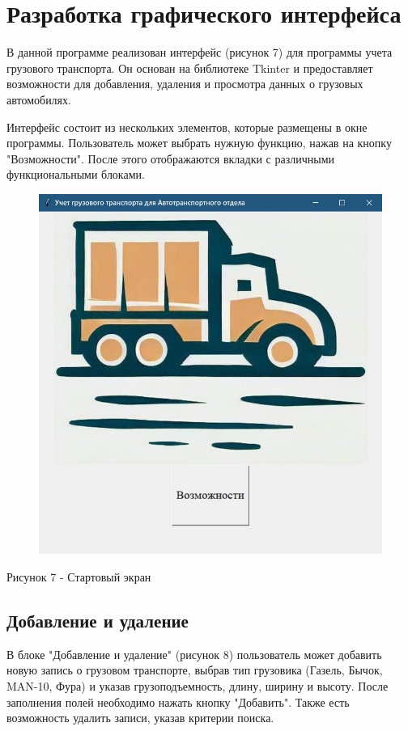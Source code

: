\documentclass[14pt]{extreport}
\begin{document}
    \section{Разработка графического интерфейса}

    В данной программе реализован интерфейс (рисунок 7) для программы учета грузового транспорта. Он основан на библиотеке Tkinter и предоставляет возможности для добавления, удаления и просмотра данных о грузовых автомобилях.

Интерфейс состоит из нескольких элементов, которые размещены в окне программы. Пользователь может выбрать нужную функцию, нажав на кнопку "Возможности". После этого отображаются вкладки с различными функциональными блоками.
\begin{figure}[H]
    \centering
    \includegraphics[scale=0.7]{1.jpg}
\end{figure}
\begin{center}
    Рисунок 7 - Стартовый экран
\end{center}

\subsection{Добавление и удаление}

В блоке "Добавление и удаление" (рисунок 8) пользователь может добавить новую запись о грузовом транспорте, выбрав тип грузовика (Газель, Бычок, MAN-10, Фура) и указав грузоподъемность, длину, ширину и высоту. После заполнения полей необходимо нажать кнопку "Добавить". Также есть возможность удалить записи, указав критерии поиска.
\end{document}
